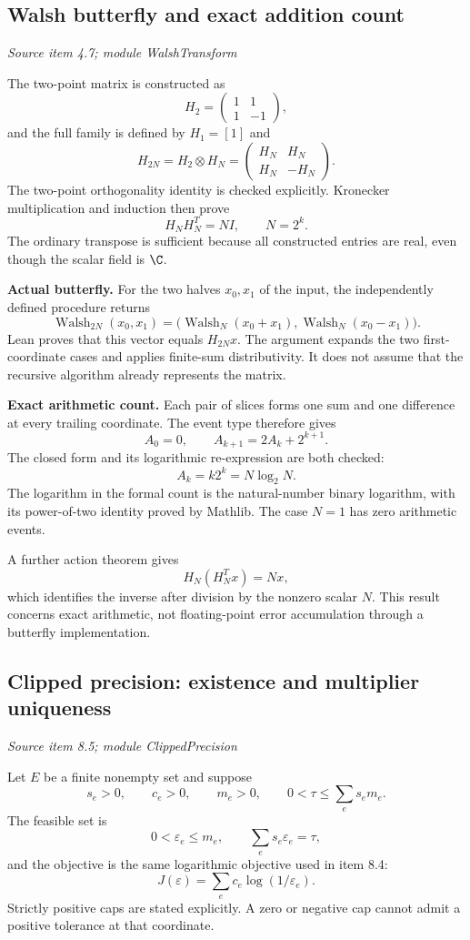 \subsection{Walsh butterfly and exact addition count}\label{supp4:subsection:004}\textit{Source item 4.7; module WalshTransform}\par
The two-point matrix is constructed as
\[
H_2=\begin{pmatrix}1&1\\1&-1\end{pmatrix},
\]
and the full family is defined by $H_1=[1]$ and
\[
H_{2N}=H_2\otimes H_N
=\begin{pmatrix}H_N&H_N\\H_N&-H_N\end{pmatrix}.
\]
The two-point orthogonality identity is checked explicitly. Kronecker multiplication and induction then prove
\[
\boxed{H_NH_N^T=NI,\qquad N=2^k.}
\]
The ordinary transpose is sufficient because all constructed entries are real, even though the scalar field is $\C$.

\textbf{Actual butterfly.} For the two halves $x_0,x_1$ of the input, the independently defined procedure returns
\[
\operatorname{Walsh}_{2N}(x_0,x_1)
=\bigl(\operatorname{Walsh}_N(x_0+x_1),
       \operatorname{Walsh}_N(x_0-x_1)\bigr).
\]
Lean proves that this vector equals $H_{2N}x$. The argument expands the two first-coordinate cases and applies finite-sum distributivity. It does not assume that the recursive algorithm already represents the matrix.

\textbf{Exact arithmetic count.} Each pair of slices forms one sum and one difference at every trailing coordinate. The event type therefore gives
\[
A_0=0,\qquad A_{k+1}=2A_k+2^{k+1}.
\]
The closed form and its logarithmic re-expression are both checked:
\[
\boxed{A_k=k2^k=N\log_2N.}
\]
The logarithm in the formal count is the natural-number binary logarithm, with its power-of-two identity proved by Mathlib. The case $N=1$ has zero arithmetic events.

A further action theorem gives
\[
H_N(H_N^Tx)=Nx,
\]
which identifies the inverse after division by the nonzero scalar $N$. This result concerns exact arithmetic, not floating-point error accumulation through a butterfly implementation.



\subsection{Clipped precision: existence and multiplier uniqueness}\label{supp4:subsection:005}\textit{Source item 8.5; module ClippedPrecision}\par
Let $E$ be a finite nonempty set and suppose
\[
s_e>0,\qquad c_e>0,\qquad m_e>0,
\qquad 0<\tau\le\sum_e s_em_e.
\]
The feasible set is
\[
0<\varepsilon_e\le m_e,\qquad \sum_e s_e\varepsilon_e=\tau,
\]
and the objective is the same logarithmic objective used in item 8.4:
\[
J(\varepsilon)=\sum_e c_e\log(1/\varepsilon_e).
\]
Strictly positive caps are stated explicitly. A zero or negative cap cannot admit a positive tolerance at that coordinate.

